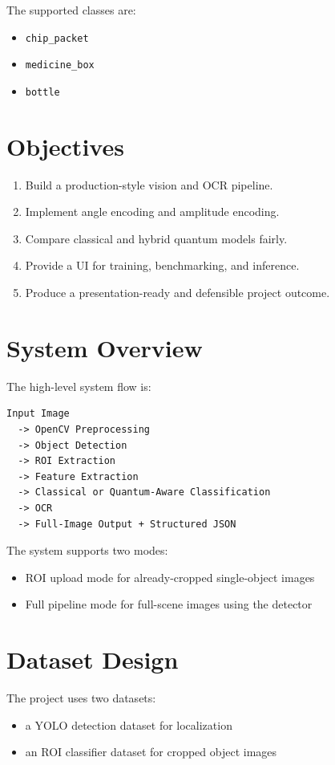 \documentclass[12pt,a4paper]{article}
\begin{document}
The supported classes are:
\begin{itemize}
  \item \texttt{chip\_packet}
  \item \texttt{medicine\_box}
  \item \texttt{bottle}
\end{itemize}

\section{Objectives}

\begin{enumerate}
  \item Build a production-style vision and OCR pipeline.
  \item Implement angle encoding and amplitude encoding.
  \item Compare classical and hybrid quantum models fairly.
  \item Provide a UI for training, benchmarking, and inference.
  \item Produce a presentation-ready and defensible project outcome.
\end{enumerate}

\section{System Overview}

The high-level system flow is:

\begin{verbatim}
Input Image
  -> OpenCV Preprocessing
  -> Object Detection
  -> ROI Extraction
  -> Feature Extraction
  -> Classical or Quantum-Aware Classification
  -> OCR
  -> Full-Image Output + Structured JSON
\end{verbatim}

The system supports two modes:
\begin{itemize}
  \item ROI upload mode for already-cropped single-object images
  \item Full pipeline mode for full-scene images using the detector
\end{itemize}

\section{Dataset Design}

The project uses two datasets:
\begin{itemize}
  \item a YOLO detection dataset for localization
  \item an ROI classifier dataset for cropped object images
\end{itemize}
\end{document}
